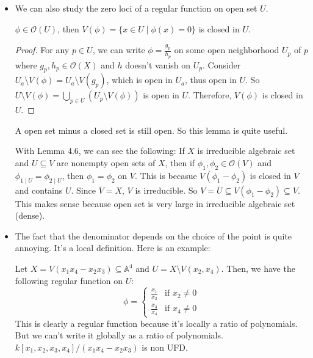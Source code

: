 \documentclass[15pt]{scrartcl}
\newcommand{\A}{\mathbb{A}}
\newcommand{\cO}{\mathcal{O}}
\begin{document}
\begin{itemize}
    \item We can also study the zero loci of a regular function on open set $U$. 
    \begin{lemma}
        $\phi\in \cO(U)$, then $V(\phi)=\{x\in U\mid \phi(x)=0\}$ is closed in $U$. 
    \end{lemma}
    \begin{proof}
        For any $p\in U$, we can write $\phi=\frac{g_p}{h_p}$ on some open neighborhood $U_p$ of $p$ where $g_p,h_p\in \mathcal{O}(X)$ and $h$ doesn't vanish on $U_p$. Consider $U_a\setminus V(\phi)=U_a\setminus V(g_p)$, which is open in $U_a$, thus open in $U$. So $U\setminus V(\phi)=\bigcup_{p\in U} (U_p\setminus V(\phi))$ is open in $U$. Therefore, $V(\phi)$ is closed in $U$.
    \end{proof}
    \begin{remark}
        A open set minus a closed set is still open. So this lemma is quite useful. 
    \end{remark}
    \begin{remark}
        With Lemma 4.6, we can see the following: If $X$ is irreducible algebraic set and $U\subseteq V$ are nonempty open sets of $X$, then if $\phi_1, \phi_2\in \mathcal{O}(V)$ and $\phi_{1\mid U}=\phi_{2\mid U}$, then $\phi_1=\phi_2$ on $V$. This is becasue $V(\phi_1-\phi_2)$ is closed in $V$ and contains $U$. Since $\overline{V}=X$, $V$ is irreducible. So $V=\overline{U}\subseteq V(\phi_1-\phi_2)\subseteq V$. This makes sense because open set is very large in irreducible algebraic set (dense). 
    \end{remark}
    \item The fact that the denominator depends on the choice of the point is quite annoying. It's a local definition. Here is an example: 
        \begin{example}
            Let $X=V(x_1x_4-x_2x_3)\subseteq \A^4$ and $U=X\setminus V(x_2,x_4)$. 
            Then, we have the following regular function on $U$:
            \[\phi=\begin{cases}
                \frac{x_1}{x_2} & \text{if } x_2\neq 0\\
                \frac{x_3}{x_4} & \text{if } x_4\neq 0
            \end{cases}\]
        This is clearly a regular function because it's locally a ratio of polynomials. But we can't write it globally as a ratio of polynomials. $k[x_1,x_2,x_3,x_4]/(x_1x_4-x_2x_3)$ is non UFD. 
        \end{example}

\end{itemize}
\end{document}
